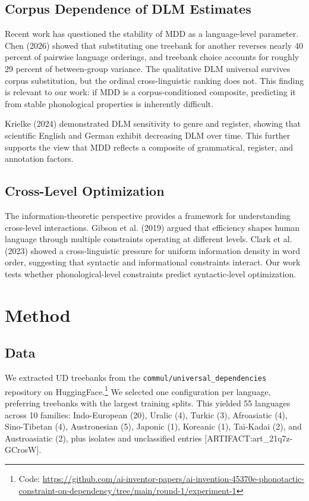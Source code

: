 \documentclass[11pt,letterpaper]{article}
\begin{document}
\subsection{Corpus Dependence of DLM Estimates}

Recent work has questioned the stability of MDD as a language-level parameter. Chen (2026) showed that substituting one treebank for another reverses nearly 40 percent of pairwise language orderings, and treebank choice accounts for roughly 29 percent of between-group variance. The qualitative DLM universal survives corpus substitution, but the ordinal cross-linguistic ranking does not. This finding is relevant to our work: if MDD is a corpus-conditioned composite, predicting it from stable phonological properties is inherently difficult.

Krielke (2024) demonstrated DLM sensitivity to genre and register, showing that scientific English and German exhibit decreasing DLM over time. This further supports the view that MDD reflects a composite of grammatical, register, and annotation factors.

\subsection{Cross-Level Optimization}

The information-theoretic perspective provides a framework for understanding cross-level interactions. Gibson et al. (2019) argued that efficiency shapes human language through multiple constraints operating at different levels. Clark et al. (2023) showed a cross-linguistic pressure for uniform information density in word order, suggesting that syntactic and informational constraints interact. Our work tests whether phonological-level constraints predict syntactic-level optimization.

\section{Method}

\subsection{Data}

We extracted UD treebanks from the \texttt{commul/universal\_dependencies} repository on HuggingFace.\footnote{Code: \url{https://github.com/ai-inventor-papers/ai-invention-45370e-phonotactic-constraint-on-dependency/tree/main/round-1/experiment-1}} We selected one configuration per language, preferring treebanks with the largest training splits. This yielded 55 languages across 10 families: Indo-European (20), Uralic (4), Turkic (3), Afroasiatic (4), Sino-Tibetan (4), Austronesian (5), Japonic (1), Koreanic (1), Tai-Kadai (2), and Austroasiatic (2), plus isolates and unclassified entries [ARTIFACT:art\_21q7z-GCrosW].
\end{document}
